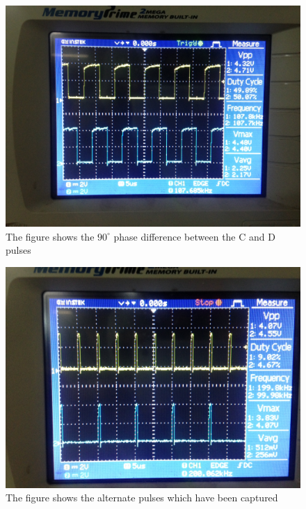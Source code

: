 \documentclass{article}
\begin{document}
\begin{figure}[h]
	\centering
	\includegraphics[scale = 0.1]{images/CD.JPG}
	\caption{The figure shows the $90^\circ$ phase difference between the C and D pulses}
	\label{Fig :1b}
\end{figure}

\begin{figure}[h]
	\centering
	\includegraphics[scale = 0.1]{images/Selected_pulses.JPG}
	\caption{The figure shows the alternate pulses which have been captured}
	\label{Fig :1b}
\end{figure}
\end{document}
